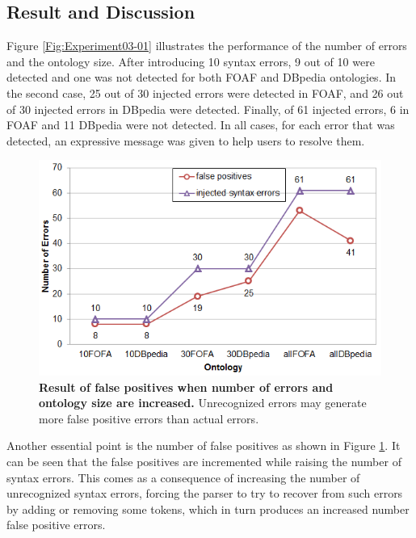 \subsection{Result and Discussion}

Figure \ref{Fig:Experiment03-01} illustrates the performance of the number of errors and the ontology size. 
After introducing 10 syntax errors, 9 out of 10 were detected and one was not detected for both FOAF and DBpedia ontologies. 
In the second case, 25 out of 30 injected errors were detected in FOAF, and 26 out of 30 injected errors in DBpedia were detected. 
Finally, of 61 injected errors, 6 in FOAF and 11 DBpedia were not detected.
In all cases, for each error that was detected, an expressive message was given to help users to resolve them. 




\begin{figure}[ht]
\begin{center}
		\includegraphics[scale=0.9,angle=0]{images/Experiment03-02.png}
		\vspace*{-4mm}
		\caption{\textbf{Result of false positives when number of errors and ontology size are increased.} Unrecognized errors may generate more false positive errors than actual errors. 
		}
   \label{Fig:Experiment03-02}
\end{center}
\end{figure}
Another essential point is the number of false positives as shown in Figure \ref{Fig:Experiment03-02}. 
It can be seen that the false positives are incremented while raising the number of syntax errors.
This comes as a consequence of increasing the number of unrecognized syntax errors, forcing the parser to try to recover from such errors by adding or removing some tokens, which in turn produces an increased number false positive errors.   


